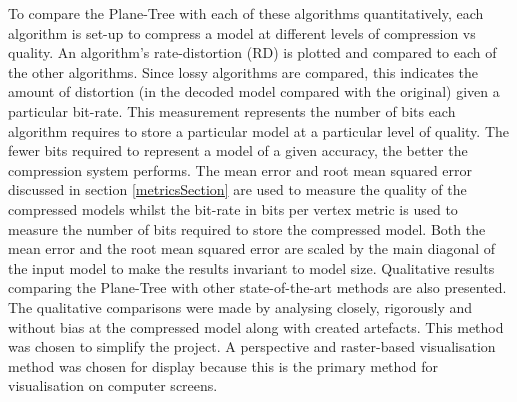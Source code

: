 To compare the Plane-Tree with each of these algorithms quantitatively, each algorithm is set-up to compress a model at different levels of compression vs quality. An algorithm's rate-distortion (RD) is plotted and compared to each of the other algorithms. Since lossy algorithms are compared, this indicates the amount of distortion (in the decoded model compared with the original) given a particular bit-rate. This measurement represents the number of bits each algorithm requires to store a particular model at a particular level of quality. The fewer bits required to represent a model of a given accuracy, the better the compression system performs. The mean error and root mean squared error discussed in section \ref{metricsSection} are used to measure the quality of the compressed models whilst the bit-rate in bits per vertex metric is used to measure the number of bits required to store the compressed model. Both the mean error and the root mean squared error are scaled by the main diagonal of the input model to make the results invariant to model size. Qualitative results comparing the Plane-Tree with other state-of-the-art methods are also presented. The qualitative comparisons were made by analysing closely, rigorously and without bias at the compressed model along with created artefacts. This method was chosen to simplify the project. A perspective and raster-based visualisation method was chosen for display because this is the primary method for visualisation on computer screens. \\


